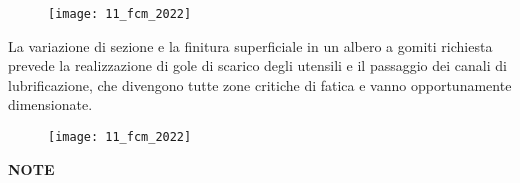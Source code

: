 \documentclass{article}
\begin{document}
\begin{figure}[H]
\texttt{[image: 11\_fcm\_2022]}
\end{figure}
\begin{adjustwidth}{2in}{}			
			
			La variazione di sezione e la finitura superficiale in un albero a gomiti richiesta prevede la realizzazione di gole di scarico degli utensili e il passaggio dei canali di lubrificazione, che divengono tutte zone critiche di fatica e vanno opportunamente dimensionate.
			
				\end{adjustwidth}
			\begin{figure}[H]
			\texttt{[image: 11\_fcm\_2022]}
			\end{figure}
			\begin{adjustwidth}{2in}{}
			
			
			
			
			
			 
			 
			 
	
	
	
	
	
	
	
	
	
	
	
	
	\textbf{{\LARGE NOTE}}
	
\end{adjustwidth}
\end{document}
